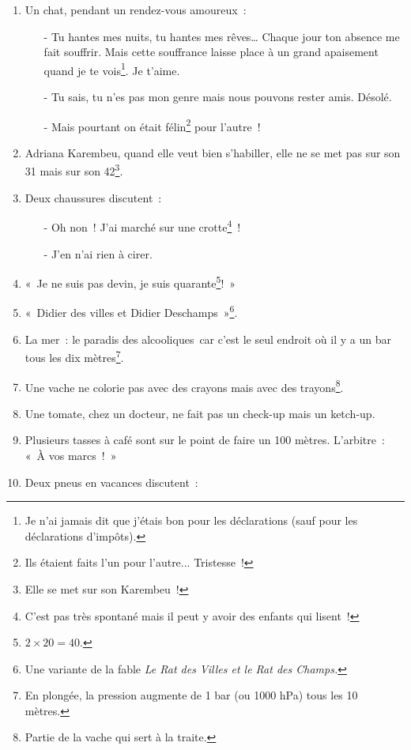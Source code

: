 \documentclass[10pt,a5paper,fullpage]{book}
\begin{document}
\begin{enumerate}
		\item Un chat, pendant un rendez-vous amoureux~:
		\begin{itemize}
			\item[-] Tu hantes mes nuits, tu hantes mes rêves… Chaque jour ton absence me fait souffrir. Mais cette souffrance laisse place à un grand apaisement quand je te vois\footnote{Je n'ai jamais dit que j'étais bon pour les déclarations (sauf pour les déclarations d'impôts).}. Je t’aime.
			\item[-] Tu sais, tu n’es pas mon genre mais nous pouvons rester amis. Désolé.
			\item[-] Mais pourtant on était félin\footnote{Ils étaient faits l'un pour l'autre... Tristesse~!} pour l’autre~!
		\end{itemize}			
		\item Adriana Karembeu, quand elle veut bien s’habiller, elle ne se met pas sur son 31 mais sur son 42\footnote{Elle se met sur son Karembeu~!}.
		\item Deux chaussures discutent~:
		\begin{itemize}
			\item[-] Oh non~! J'ai marché sur une crotte\footnote{C'est pas très spontané mais il peut y avoir des enfants qui lisent~!}~! 
			\item[-] J'en n’ai rien à cirer. 
		\end{itemize}
		\item « Je ne suis pas devin, je suis quarante\footnote{$2\times20 = 40$.}!~»
		\item «~Didier des villes et Didier Deschamps~»\footnote{Une variante de la fable \textit{Le Rat des Villes et le Rat des Champs.}}.
		\item La mer~: le paradis des alcooliques car c’est le seul endroit où il y a un bar tous les dix mètres\footnote{En plongée, la pression augmente de 1 bar (ou 1000 hPa) tous les 10 mètres.}.
		\item Une vache ne colorie pas avec des crayons mais avec des trayons\footnote{Partie de la vache qui sert à la traite.}.
		\item Une tomate, chez un docteur, ne fait pas un check-up mais un ketch-up.
		\item Plusieurs tasses à café sont sur le point de faire un 100 mètres. L’arbitre~: «~À vos marcs~!~»
		\item Deux pneus en vacances discutent~:
		\begin{itemize}

\end{itemize}
\end{enumerate}
\end{document}
